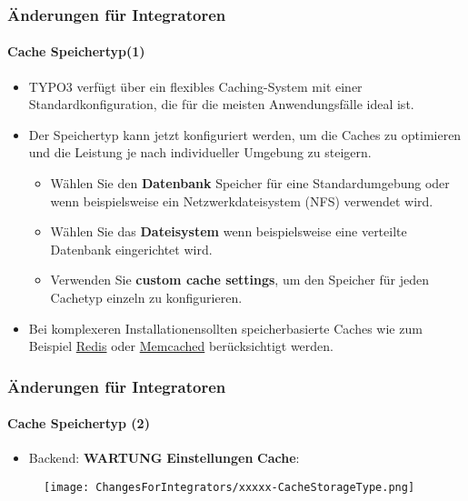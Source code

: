 \begin{frame}[fragile]
	\frametitle{Änderungen für Integratoren}
	\framesubtitle{Cache Speichertyp(1)}

	\begin{itemize}

		\item TYPO3 verfügt über ein flexibles Caching-System mit einer Standardkonfiguration,
			die für die meisten Anwendungsfälle ideal ist.
		\item Der Speichertyp kann jetzt konfiguriert werden, um die Caches zu optimieren und die Leistung
			je nach individueller Umgebung zu steigern.

			\begin{itemize}
				\item Wählen Sie den \textbf{Datenbank} Speicher für eine Standardumgebung
					oder wenn beispielsweise ein Netzwerkdateisystem (NFS) verwendet wird.
				\item Wählen Sie das \textbf{Dateisystem} wenn beispielsweise eine verteilte Datenbank 
					eingerichtet wird.
				\item Verwenden Sie \textbf{custom cache settings}, um den Speicher für
					jeden Cachetyp einzeln zu konfigurieren.
			\end{itemize}

		\item Bei komplexeren Installationensollten speicherbasierte Caches wie zum Beispiel
			\href{https://redis.io/}{Redis}
			oder
			\href{https://memcached.org/}{Memcached}
			berücksichtigt werden.

	\end{itemize}

\end{frame}


\begin{frame}[fragile]
	\frametitle{Änderungen für Integratoren}
	\framesubtitle{Cache Speichertyp (2)}

	\begin{itemize}

		\item Backend: \textbf{WARTUNG} \hspace{0.1cm}\textbf{Einstellungen} \hspace{0.1cm}\textbf{Cache}:
		\end{itemize}

	\begin{figure}
		\texttt{[image: ChangesForIntegrators/xxxxx-CacheStorageType.png]}
	\end{figure}

\end{frame}

